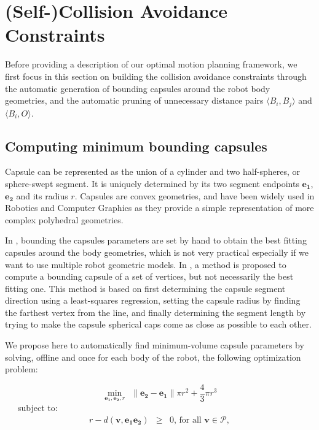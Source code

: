 \section{(Self-)Collision Avoidance Constraints}
\label{distance-constraints}

Before providing a description of our optimal motion planning
framework, we first focus in this section on building the collision
avoidance constraints through the automatic generation of bounding
capsules around the robot body geometries, and the automatic pruning
of unnecessary distance pairs $\langle B_i,B_j\rangle$ and $\langle
B_i,O\rangle$.

\subsection{Computing minimum bounding capsules}

Capsule can be represented as the union of a cylinder and two
half-spheres, or sphere-swept segment. It is uniquely determined by
its two segment endpoints $\mathbf{e_1}$, $\mathbf{e_2}$ and its
radius $r$. Capsules are convex geometries, and have been widely used
in Robotics and Computer Graphics as they provide a simple
representation of more complex polyhedral geometries.

In \cite{Kanoun2011}, bounding the capsules parameters are set by hand
to obtain the best fitting capsules around the body geometries, which
is not very practical especially if we want to use multiple robot
geometric models. In \cite{eberly20073d}, a method is proposed to
compute a bounding capsule of a set of vertices, but not necessarily
the best fitting one. This method is based on first determining the
capsule segment direction using a least-squares regression, setting
the capsule radius by finding the farthest vertex from the line, and
finally determining the segment length by trying to make the capsule
spherical caps come as close as possible to each other.

We propose here to automatically find minimum-volume capsule
parameters by solving, offline and once for each body of the robot,
the following optimization problem:

\begin{equation}
  \min_{\mathbf{e_1}, \mathbf{e_2}, r} \ \ 
  \|\mathbf{e_2} - \mathbf{e_1}\| \pi r^2 + \frac{4}{3}\pi r^3
  \label{capsule-objective}
\end{equation}
\ \ \ subject to:
\begin{equation}
  \begin{array}{rcll}
    r - d(\mathbf{\mathbf{v}},\mathbf{e_1e_2}) & \ge & 0\mbox{, for all }
    \mathbf{v} \in \mathcal{P},
    \label{capsule-constraint}
  \end{array}
\end{equation} 

